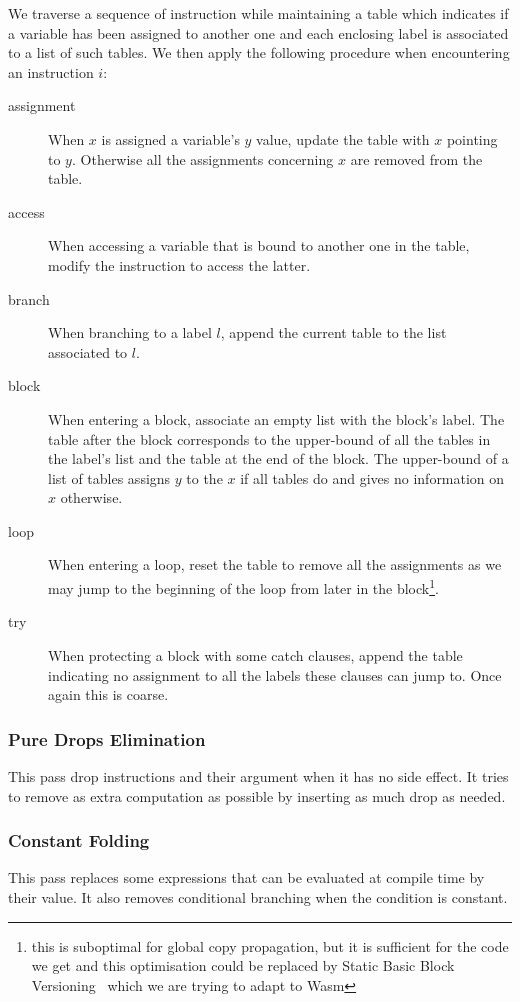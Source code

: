 \documentclass[a4paper,11pt]{article}
\begin{document}
We traverse a sequence of instruction while maintaining a table which indicates
if a variable has been assigned to another one and each enclosing label is
associated to a list of such tables. We then apply the following procedure when
encountering an instruction $i$:
\begin{description}
  \item[assignment] When $x$ is assigned a variable's $y$ value, update the
    table with $x$ pointing to $y$. Otherwise all the assignments concerning $x$
    are removed from the table.
  \item[access] When accessing a variable that is bound to another one in the
    table, modify the instruction to access the latter.
  \item[branch] When branching to a label $l$, append the current table to
    the list associated to $l$.
  \item[block] When entering a block, associate an empty list with the block's
    label. The table after the block corresponds to the upper-bound of all the
    tables in the label's list and the table at the end of the block. The
    upper-bound of a list of tables assigns $y$ to the $x$ if all tables do and
    gives no information on $x$ otherwise.
  \item[loop] When entering a loop, reset the table to remove all the
    assignments as we may jump to the beginning of the loop from later in the
    block\footnote{this is suboptimal for global copy propagation, but it is
    sufficient for the code we get and this optimisation could be replaced by
    Static Basic Block Versioning~\cite{melanccon2024static} which we are trying
    to adapt to Wasm}.
  \item[try] When protecting a block with some \textsf{catch} clauses, append
    the table indicating no assignment to all the labels these clauses can jump
    to. Once again this is coarse.
\end{description}
\subsubsection{Pure Drops Elimination}
This pass \textsf{drop} instructions and their argument when it has no side
effect. It tries to remove as extra computation as possible by inserting as much
\textsf{drop} as needed.

\subsubsection{Constant Folding}
This pass replaces some expressions that can be evaluated at compile time by
their value. It also removes conditional branching when the condition is
constant.
\end{document}
